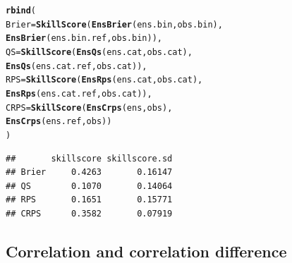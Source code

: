 \documentclass[article]{jss}\usepackage{graphicx, color}
\makeatletter
\newcommand{\hlfunctioncall}[1]{\textcolor[rgb]{0,0.501960784313725,0.752941176470588}{\textbf{#1}}}%
\newenvironment{kframe}{%
 \def\at@end@of@kframe{}%
 \ifinner\ifhmode%
  \def\at@end@of@kframe{\end{minipage}}%
  \begin{minipage}{\columnwidth}%
 \fi\fi%
 \def\FrameCommand##1{\hskip\@totalleftmargin \hskip-\fboxsep
 \colorbox{shadecolor}{##1}\hskip-\fboxsep
     \hskip-\linewidth \hskip-\@totalleftmargin \hskip\columnwidth}%
 \MakeFramed {\advance\hsize-\width
   \@totalleftmargin\z@ \linewidth\hsize
   \@setminipage}}%
 {\par\unskip\endMakeFramed%
 \at@end@of@kframe}
\newenvironment{knitrout}{}{} %
\makeatother
\begin{document}
\begin{knitrout}
\color{fgcolor}\begin{kframe}
\begin{alltt}
\hlfunctioncall{rbind}(
 Brier = \hlfunctioncall{SkillScore}(\hlfunctioncall{EnsBrier}(ens.bin, obs.bin), 
                    \hlfunctioncall{EnsBrier}(ens.bin.ref, obs.bin)),
 QS    = \hlfunctioncall{SkillScore}(\hlfunctioncall{EnsQs}(ens.cat, obs.cat),    
                    \hlfunctioncall{EnsQs}(ens.cat.ref, obs.cat)),
 RPS   = \hlfunctioncall{SkillScore}(\hlfunctioncall{EnsRps}(ens.cat, obs.cat),   
                    \hlfunctioncall{EnsRps}(ens.cat.ref, obs.cat)),
 CRPS  = \hlfunctioncall{SkillScore}(\hlfunctioncall{EnsCrps}(ens, obs),          
                    \hlfunctioncall{EnsCrps}(ens.ref, obs))
)
\end{alltt}
\begin{verbatim}
##       skillscore skillscore.sd
## Brier     0.4263       0.16147
## QS        0.1070       0.14064
## RPS       0.1651       0.15771
## CRPS      0.3582       0.07919
\end{verbatim}
\end{kframe}
\end{knitrout}



\subsection{Correlation and correlation difference}
\end{document}

